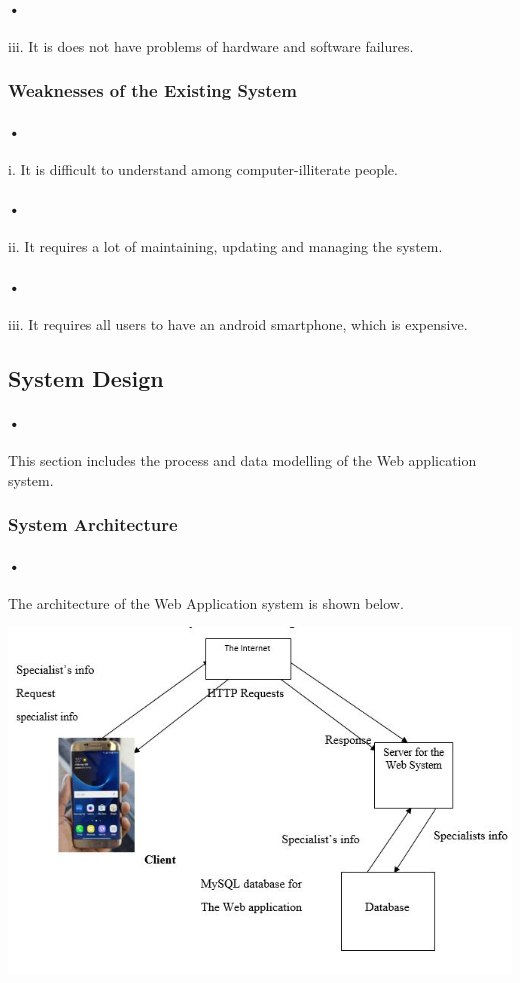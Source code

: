 \documentclass[12pt]{article}
\begin{document}
\paragraph{•}iii.	It is does not have problems of hardware and software failures. 

\subsubsection{Weaknesses of the Existing System}  
\paragraph{•}i.	It is difficult to understand among computer-illiterate people.
\paragraph{•}ii.	It requires a lot of maintaining, updating and managing the system.
\paragraph{•}iii.	It requires all users to have an android smartphone, which is expensive. 

\subsection{System Design}  
\paragraph{•}This section includes the process and data modelling of the Web application system.

\subsubsection{System Architecture} 
\paragraph{•}The architecture of the Web Application system is shown below.
\begin{center}
\includegraphics[scale=1.0]{architecture}
\end{center}
\end{document}
